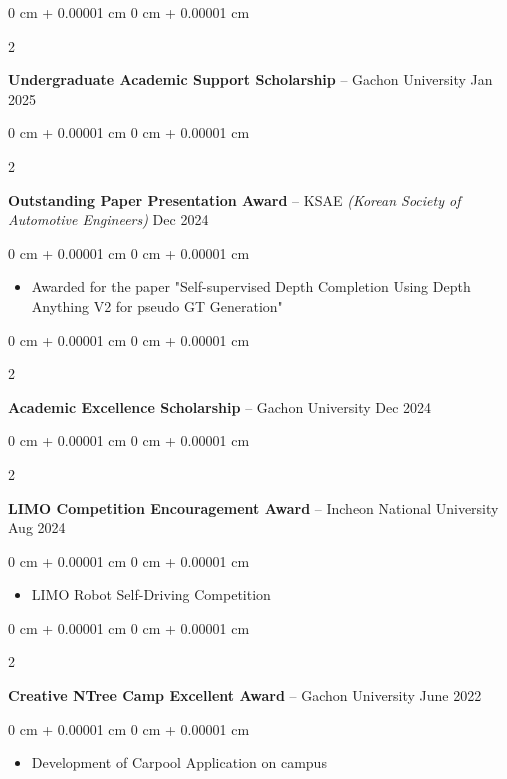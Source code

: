 \documentclass[10pt, letterpaper]{article}
\newenvironment{highlights}{
    \begin{itemize}[
        topsep=0.10 cm,
        parsep=0.10 cm,
        partopsep=0pt,
        itemsep=0pt,
        leftmargin=0 cm + 10pt
    ]
}{
    \end{itemize}
} %
\newenvironment{onecolentry}{
    \begin{adjustwidth}{
        0 cm + 0.00001 cm
    }{
        0 cm + 0.00001 cm
    }
}{
    \end{adjustwidth}
} %
\newenvironment{twocolentry}[2][]{
    \onecolentry
    \def\secondColumn{#2}
    \setcolumnwidth{\fill, 4.5 cm}
    \begin{paracol}{2}
}{
    \switchcolumn \raggedleft \secondColumn
    \end{paracol}
    \endonecolentry
} %
\begin{document}
        \begin{twocolentry}{
            Jan 2025
        }
            \textbf{Undergraduate Academic Support Scholarship} -- Gachon University\end{twocolentry}
        \vspace{0.2 cm}

        \begin{twocolentry}{
            Dec 2024
        }
            \textbf{Outstanding Paper Presentation Award} -- KSAE \textit{\footnotesize (Korean Society of Automotive Engineers)}\end{twocolentry}

        \vspace{0.10 cm}
        \begin{onecolentry}
            \begin{highlights}
                \item Awarded for the paper "Self-supervised Depth Completion Using Depth Anything V2 for pseudo GT Generation"
            \end{highlights}
        \end{onecolentry}
        
        \vspace{0.2 cm}
        
        \begin{twocolentry}{
            Dec 2024
        }
            \textbf{Academic Excellence Scholarship} -- Gachon University\end{twocolentry}
        \vspace{0.2 cm}
        \begin{twocolentry}{
            Aug 2024
        }
            \textbf{LIMO Competition Encouragement Award} -- Incheon National University\end{twocolentry}
        \vspace{0.10 cm}
        \begin{onecolentry}
            \begin{highlights}
                \item LIMO Robot Self-Driving Competition
            \end{highlights}
        \end{onecolentry}
        \vspace{0.2 cm}

        \begin{twocolentry}{
            June 2022
        }
            \textbf{Creative NTree Camp Excellent Award} -- Gachon University\end{twocolentry}
        \vspace{0.10 cm}
        \begin{onecolentry}
            \begin{highlights}
                \item Development of Carpool Application on campus
            \end{highlights}
        \end{onecolentry}
\end{document}
